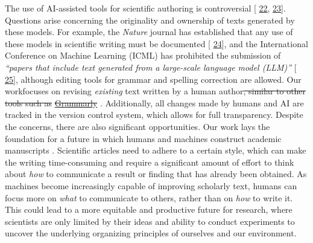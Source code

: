 \documentclass[
]{article}
\providecommand{\DIFaddtex}[1]{{\protect\color{blue}\uwave{#1}}} %
\providecommand{\DIFdeltex}[1]{{\protect\color{red}\sout{#1}}}                      %
\providecommand{\DIFaddbegin}{} %
\providecommand{\DIFaddend}{} %
\providecommand{\DIFdelbegin}{} %
\providecommand{\DIFdelend}{} %
\providecommand{\DIFadd}[1]{\texorpdfstring{\DIFaddtex{#1}}{#1}} %
\providecommand{\DIFdel}[1]{\texorpdfstring{\DIFdeltex{#1}}{}} %
\newcommand{\DIFscaledelfig}{0.5}
\newlength{\DIFdelgraphicswidth} %
\newlength{\DIFdelgraphicsheight} %
\newcommand{\DIFaddincludegraphics}[2][]{{\color{blue}\fbox{\DIFOincludegraphics[#1]{#2}}}} %
\newcommand{\DIFdelincludegraphics}[2][]{%
\sbox{\DIFdelgraphicsbox}{\DIFOincludegraphics[#1]{#2}}%
\settoboxwidth{\DIFdelgraphicswidth}{\DIFdelgraphicsbox} %
\settoboxtotalheight{\DIFdelgraphicsheight}{\DIFdelgraphicsbox} %
\scalebox{\DIFscaledelfig}{%
\parbox[b]{\DIFdelgraphicswidth}{\usebox{\DIFdelgraphicsbox}\\[-\baselineskip] \rule{\DIFdelgraphicswidth}{0em}}\llap{\resizebox{\DIFdelgraphicswidth}{\DIFdelgraphicsheight}{%
\setlength{\unitlength}{\DIFdelgraphicswidth}%
\begin{picture}(1,1)%
\thicklines\linethickness{2pt} %
{\color[rgb]{1,0,0}\put(0,0){\framebox(1,1){}}}%
{\color[rgb]{1,0,0}\put(0,0){\line( 1,1){1}}}%
{\color[rgb]{1,0,0}\put(0,1){\line(1,-1){1}}}%
\end{picture}%
}\hspace*{3pt}}} %
} %
\DeclareRobustCommand{\DIFaddbegin}{\DIFOaddbegin \let\includegraphics\DIFaddincludegraphics} %
\DeclareRobustCommand{\DIFaddend}{\DIFOaddend \let\includegraphics\DIFOincludegraphics} %
\DeclareRobustCommand{\DIFdelbegin}{\DIFOdelbegin \let\includegraphics\DIFdelincludegraphics} %
\DeclareRobustCommand{\DIFdelend}{\DIFOaddend \let\includegraphics\DIFOincludegraphics} %
\begin{document}
The use of AI-assisted tools for scientific authoring is controversial {[}\protect\DIFdelbegin %
\DIFdelend \DIFaddbegin \hyperlink{ref-1EAonKBXJ}{22}\DIFaddend ,\protect\DIFdelbegin %
\DIFdelend \DIFaddbegin \hyperlink{ref-KJTJqmxc}{23}{]}\DIFaddend .
Questions arise concerning the originality and ownership of texts generated by these models.
For example, the \emph{Nature} journal has established that any use of these models in scientific writing must be documented {[}\protect\DIFdelbegin %
\DIFdelend \DIFaddbegin \hyperlink{ref-wQLVc4o7}{24}{]}\DIFaddend , and the International Conference on Machine Learning (ICML) has prohibited the submission of \emph{``papers that include text generated from a large-scale language model (LLM)''} {[}\protect\DIFdelbegin %
\DIFdelend \DIFaddbegin \hyperlink{ref-K58CKD6D}{25}{]}\DIFaddend , although editing tools for grammar and spelling correction are allowed.
Our work\DIFaddbegin \DIFadd{, however, }\DIFaddend focuses on revising \emph{existing} text written by a human author\DIFdelbegin \DIFdel{, similar to other tools such as }\href{https://www.grammarly.com}{\DIFdel{Grammarly}}%
\DIFdelend .
Additionally, all changes made by humans and AI are tracked in the version control system, which allows for full transparency.
Despite the concerns, there are also significant opportunities.
Our work lays the foundation for a future in which humans and machines construct academic manuscripts \DIFaddbegin \DIFadd{together}\DIFaddend .
Scientific articles need to adhere to a certain style, which can make the writing time-consuming and require a significant amount of effort to think about \emph{how} to communicate a result or finding that has already been obtained.
As machines become increasingly capable of improving scholarly text, humans can focus more on \emph{what} to communicate to others, rather than on \emph{how} to write it.
This could lead to a more equitable and productive future for research, where scientists are only limited by their ideas and ability to conduct experiments to uncover the underlying organizing principles of ourselves and our environment.

\DIFdelbegin %
\DIFdelend \DIFaddbegin \subsection{\DIFadd{Funding statement}}
\DIFaddend 
\end{document}

